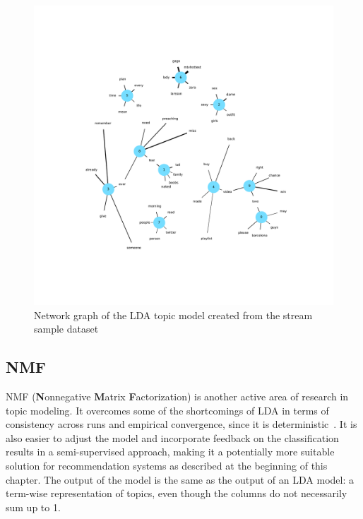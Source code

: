 \begin{figure}
    \centering
    \caption{Network graph of the LDA topic model created from the stream sample dataset}
    \label{fig:lda_network_graph}
    \includegraphics[width=\textwidth]{../figures/lda_network_graph.pdf}
\end{figure}

\subsection{NMF}
\label{subsec:nmf}

NMF (\textbf{N}onnegative \textbf{M}atrix \textbf{F}actorization) is another active area of research in topic modeling.
It overcomes some of the shortcomings of LDA in terms of consistency across runs and empirical convergence,
since it is deterministic~\cite{Choo2013}.
It is also easier to adjust the model and incorporate feedback on the classification results in a semi-supervised approach,
making it a potentially more suitable solution for recommendation systems as described at the beginning of this chapter.
The output of the model is the same as the output of an LDA model: a term-wise representation of topics, even though the columns
do not necessarily sum up to 1.


